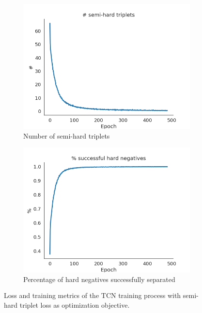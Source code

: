 \documentclass[\home/main.tex]{subfiles}
\begin{document}
\begin{figure}[p]{}
    \begin{subfigure}[t]{0.45\textwidth}
        \centering
        \includegraphics[width=\linewidth]{figures/figs_plots_semi-hard-triplets.png}
        \caption{Number of semi-hard triplets}
        \label{fig:rewards_semihardtriplets}
    \end{subfigure}
    \hfill
    \begin{subfigure}[t]{0.45\textwidth}
        \centering
        \includegraphics[width=\linewidth]{figures/figs_plots_succesful-hard-negatives.png}
        \caption{Percentage of hard negatives successfully separated}
        \label{fig:rewards_successfulhardnegatives}
    \end{subfigure}

    \caption{Loss and training metrics of the TCN training process with semi-hard triplet loss as optimization objective.}
    \label{fig:rewards_tcn_training_metrics}
\end{figure}
\end{document}

